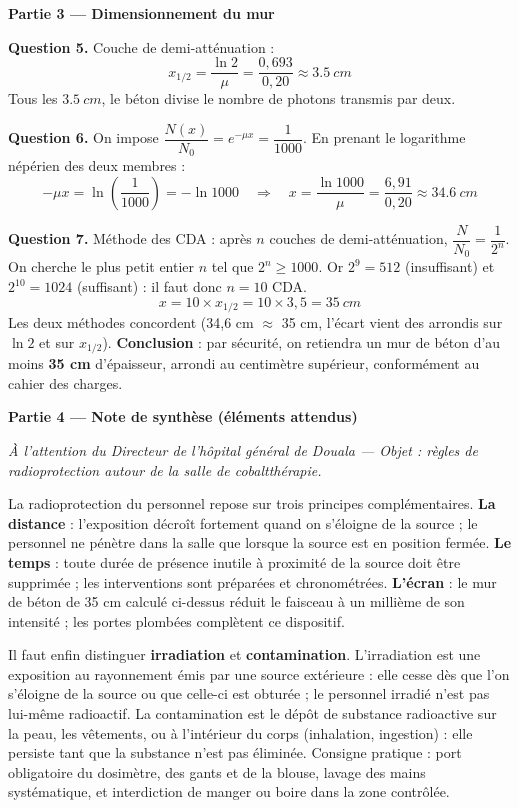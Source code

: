 \documentclass[11pt]{article}
\begin{document}
\begin{exoresolu}
\textbf{Partie 3 — Dimensionnement du mur}

\textbf{Question 5.} Couche de demi-atténuation :
\[ x_{1/2} = \frac{\ln 2}{\mu} = \frac{0,693}{0,20} \approx \SI{3,5}{cm} \]
Tous les $\SI{3,5}{cm}$, le béton divise le nombre de photons transmis par deux.

\textbf{Question 6.} On impose $\dfrac{N(x)}{N_{0}} = e^{-\mu x} = \dfrac{1}{1000}$. En prenant le logarithme népérien des deux membres :
\[ -\mu x = \ln\left(\frac{1}{1000}\right) = -\ln 1000 \quad\Longrightarrow\quad x = \frac{\ln 1000}{\mu} = \frac{6,91}{0,20} \approx \SI{34,6}{cm} \]

\textbf{Question 7.} Méthode des CDA : après $n$ couches de demi-atténuation, $\dfrac{N}{N_{0}} = \dfrac{1}{2^{n}}$. On cherche le plus petit entier $n$ tel que $2^{n} \geq 1000$. Or $2^{9} = 512$ (insuffisant) et $2^{10} = 1024$ (suffisant) : il faut donc $n = 10$ CDA.
\[ x = 10 \times x_{1/2} = 10 \times 3,5 = \SI{35}{cm} \]
Les deux méthodes concordent (34,6 cm $\approx$ 35 cm, l'écart vient des arrondis sur $\ln 2$ et sur $x_{1/2}$). \textbf{Conclusion} : par sécurité, on retiendra un mur de béton d'au moins \textbf{35 cm} d'épaisseur, arrondi au centimètre supérieur, conformément au cahier des charges.

\textbf{Partie 4 — Note de synthèse (éléments attendus)}

\emph{À l'attention du Directeur de l'hôpital général de Douala — Objet : règles de radioprotection autour de la salle de cobaltthérapie.}

La radioprotection du personnel repose sur trois principes complémentaires. \textbf{La distance} : l'exposition décroît fortement quand on s'éloigne de la source ; le personnel ne pénètre dans la salle que lorsque la source est en position fermée. \textbf{Le temps} : toute durée de présence inutile à proximité de la source doit être supprimée ; les interventions sont préparées et chronométrées. \textbf{L'écran} : le mur de béton de 35 cm calculé ci-dessus réduit le faisceau à un millième de son intensité ; les portes plombées complètent ce dispositif.

Il faut enfin distinguer \textbf{irradiation} et \textbf{contamination}. L'irradiation est une exposition au rayonnement émis par une source extérieure : elle cesse dès que l'on s'éloigne de la source ou que celle-ci est obturée ; le personnel irradié n'est pas lui-même radioactif. La contamination est le dépôt de substance radioactive sur la peau, les vêtements, ou à l'intérieur du corps (inhalation, ingestion) : elle persiste tant que la substance n'est pas éliminée. Consigne pratique : port obligatoire du dosimètre, des gants et de la blouse, lavage des mains systématique, et interdiction de manger ou boire dans la zone contrôlée.
\end{exoresolu}
\end{document}
